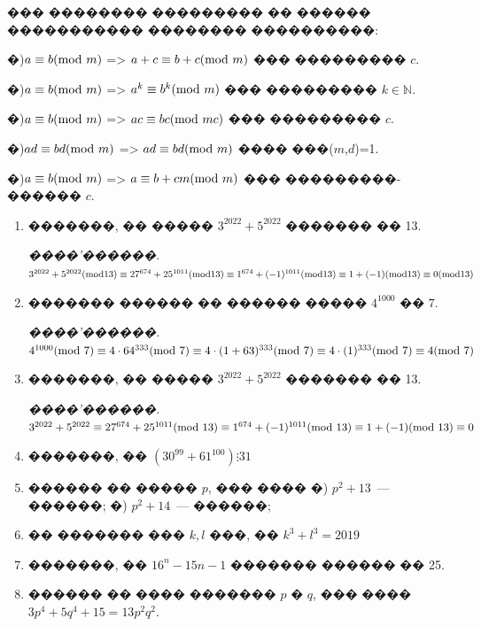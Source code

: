 \documentclass[a4paper,12pt]{article}
\begin{document}
��� �������� ��������� �� ������ ����������� �������� ����������:

�)$a\equiv b (\textmd{mod } m)$ => $a+c\equiv b+c (\textmd{mod } m)$ ��� ��������� $c$.

�)$a\equiv b (\textmd{mod } m)$ => $a^{k}\equiv b^{k} (\textmd{mod } m)$ ��� ��������� $k\in \mathbb{N}$.

�)$a\equiv b (\textmd{mod } m)$ => $ac\equiv bc (\textmd{mod } mc)$ ��� ��������� $c$.

�)$ad\equiv bd (\textmd{mod } m)$ => $ad\equiv bd (\textmd{mod } m)$ ���� ���($m$,$d$)=1.

�)$a\equiv b (\textmd{mod } m)$ => $a\equiv b+cm (\textmd{mod } m)$ ��� ���������- ������ $c$.


\medskip\medskip\medskip

\begin{enumerate}
\item �������, �� ����� $3^{2022}+5^{2022}$ ������� �� 13.

\textit{����'������.} $3^{2022}+5^{2022} (\textmd{mod} 13) \equiv 27^{674}+25^{1011} (\textmd{mod} 13) \equiv 1^{674}+(-1)^{1011} (\textmd{mod} 13) \equiv 1 + (-1) (\textmd{mod} 13) \equiv 0 (\textmd{mod} 13)$

\item ������� ������ �� ������ ����� $4^{1000}$ �� $7$.

\textit{����'������.} $4^{1000}(\textmd{mod } 7)\equiv 4\cdot 64^{333}(\textmd{mod } 7)\equiv 4\cdot (1+63)^{333}(\textmd{mod } 7) \equiv 4\cdot (1)^{333}(\textmd{mod } 7) \equiv 4(\textmd{mod } 7)$

\item �������, �� ����� $3^{2022}+5^{2022}$ ������� �� 13.

\textit{����'������.} $3^{2022}+5^{2022}\equiv 27^{674}+25^{1011}(\textmd{mod } 13) \equiv  1^{674}+(-1)^{1011}(\textmd{mod } 13) \equiv 1+(-1)(\textmd{mod } 13) \equiv 0$

\item �������, �� $(30^{99}+61^{100})\vdots 31$

 \item ������ �� ����� $p$, ��� ���� �) $p^{2}+13$~--- ������; �) $p^{2}+14$~--- ������;

\item �� ������� ��� $k,l$ ���, �� $k^{3}+l^{3}=2019$

\item �������, �� $16^{n}-15n-1$ ������� ������ �� 25.

\item ������ �� ���� ������� $p$ � $q$, ��� ���� $3p^{4}+5q^{4}+15=13p^{2}q^{2}$.


\end{enumerate}
\end{document}
